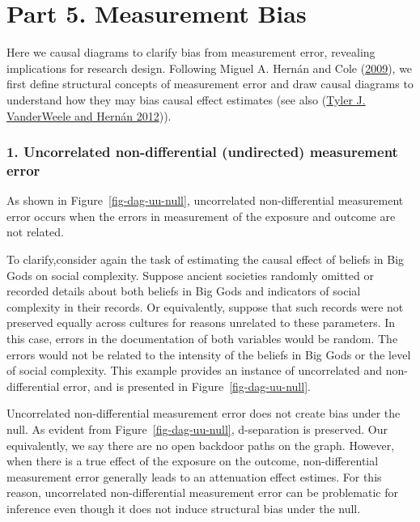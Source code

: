 \documentclass[
  singlecolumn]{report}
\begin{document}
\hypertarget{part-5.-measurement-bias}{%
\section{Part 5. Measurement Bias}\label{part-5.-measurement-bias}}

Here we causal diagrams to clarify bias from measurement error,
revealing implications for research design. Following Miguel A. Hernán
and Cole (\protect\hyperlink{ref-hernuxe1n2009}{2009}), we first define
structural concepts of measurement error and draw causal diagrams to
understand how they may bias causal effect estimates (see also
(\protect\hyperlink{ref-vanderweele2012}{Tyler J. VanderWeele and Hernán
2012})).

\hypertarget{uncorrelated-non-differential-undirected-measurement-error}{%
\subsubsection{\texorpdfstring{1. \textbf{Uncorrelated non-differential
(undirected) measurement
error}}{1. Uncorrelated non-differential (undirected) measurement error}}\label{uncorrelated-non-differential-undirected-measurement-error}}

As shown in Figure~\ref{fig-dag-uu-null}, uncorrelated non-differential
measurement error occurs when the errors in measurement of the exposure
and outcome are not related.

To clarify,consider again the task of estimating the causal effect of
beliefs in Big Gods on social complexity. Suppose ancient societies
randomly omitted or recorded details about both beliefs in Big Gods and
indicators of social complexity in their records. Or equivalently,
suppose that such records were not preserved equally across cultures for
reasons unrelated to these parameters. In this case, errors in the
documentation of both variables would be random. The errors would not be
related to the intensity of the beliefs in Big Gods or the level of
social complexity. This example provides an instance of uncorrelated and
non-differential error, and is presented in
Figure~\ref{fig-dag-uu-null}.

Uncorrelated non-differential measurement error does not create bias
under the null. As evident from Figure~\ref{fig-dag-uu-null},
d-separation is preserved. Our equivalently, we say there are no open
backdoor paths on the graph. However, when there is a true effect of the
exposure on the outcome, non-differential measurement error generally
leads to an attenuation effect estimes. For this reason, uncorrelated
non-differential measurement error can be problematic for inference even
though it does not induce structural bias under the null.
\end{document}
